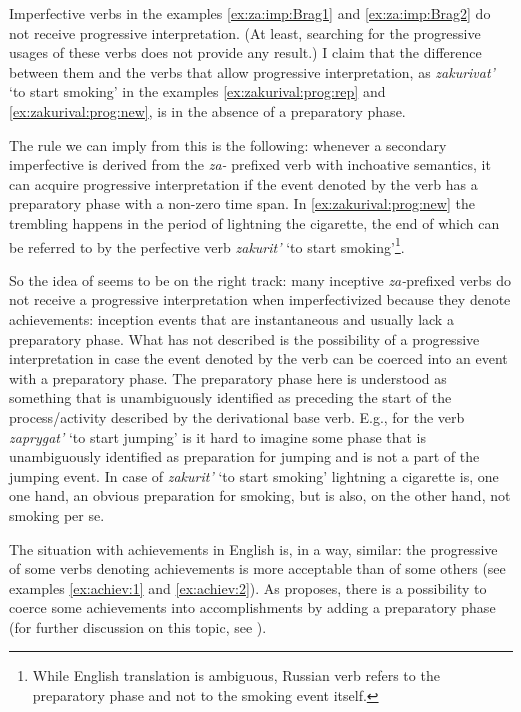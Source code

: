 Imperfective verbs in the examples \ref{ex:za:imp:Brag1} and \ref{ex:za:imp:Brag2} do not receive progressive interpretation. (At least, searching for the progressive usages of these verbs does not provide any result.) I claim that the difference between them and the verbs that allow progressive interpretation, as \textit{zakurivat'} `to start smoking' in the examples \ref{ex:zakurival:prog:rep} and \ref{ex:zakurival:prog:new}, is in the absence of a preparatory phase. 

The rule we can imply from this is the following: whenever a secondary imperfective is derived from the \textit{za-} prefixed verb with inchoative semantics, it can acquire progressive interpretation if the event denoted by the verb has a preparatory phase with a non-zero time span. In \ref{ex:zakurival:prog:new} the trembling happens in the period of lightning the cigarette, the end of which can be referred to by the perfective verb \textit{zakurit'} `to start smoking'\footnote{While English translation is ambiguous, Russian verb refers to the preparatory phase and not to the smoking event itself.}. 

So the idea of \citet{Braginsky:08} seems to be on the right track: many inceptive \textit{za-}prefixed verbs do not receive a progressive interpretation when imperfectivized because they denote achievements: inception events that are instantaneous and usually lack a preparatory phase. What \citet{Braginsky:08} has not described is the possibility of a progressive interpretation in case the event denoted by the verb can be coerced into an event with a preparatory phase. The preparatory phase here is understood as something that is unambiguously identified as preceding the start of the process/activity described by the derivational base verb. E.g., for the verb \textit{zaprygat'} `to start jumping' is it hard to imagine some phase that is unambiguously identified as preparation for jumping and is not a part of the jumping event. In case of \textit{zakurit'} `to start smoking' lightning a cigarette is, one one hand, an obvious preparation for smoking, but is also, on the other hand, not smoking per se. 

The situation with achievements in English is, in a way, similar: the progressive of some verbs denoting achievements is more acceptable than of some others (see examples \ref{ex:achiev:1} and \ref{ex:achiev:2}). As \citet{Rothstein:04} proposes, there is a possibility to coerce some achievements into accomplishments by adding a preparatory phase (for further discussion on this topic, see \citealt{Gyarmathy:15}).


